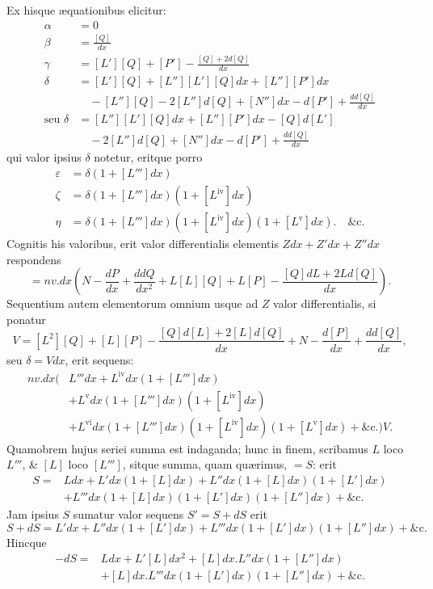 Ex hisque æquationibus elicitur:
\[
\begin{aligned}
\alpha&=0\\
\beta&=\frac{[Q]}{dx}\\
\gamma&=[L'][Q]+[P']-\frac{[Q]+2d[Q]}{dx}\\
\delta&=[L'][Q]+[L''][L'][Q]dx+[L''][P']dx\\
&\quad-[L''][Q]-2[L'']d[Q]+[N'']dx-d[P']+\frac{dd[Q]}{dx}\\
\text{seu }\delta&=[L''][L'][Q]dx+[L''][P']dx-[Q]d[L']\\
&\quad-2[L'']d[Q]+[N'']dx-d[P']+\frac{dd[Q]}{dx}
\end{aligned}
\]
qui valor ipsius $\delta$ notetur, eritque porro
\[
\begin{aligned}
\varepsilon&=\delta(1+[L''']dx)\\
\zeta&=\delta(1+[L''']dx)(1+[L^{\mathrm{iv}}]dx)\\
\eta&=\delta(1+[L''']dx)(1+[L^{\mathrm{iv}}]dx)(1+[L^{\mathrm{v}}]dx).\quad\text{\&c.}
\end{aligned}
\]
Cognitis his valoribus, erit valor differentialis elementis $Zdx+Z'dx+Z''dx$ respondens
\[
=nv.dx\left(N-\frac{dP}{dx}+\frac{ddQ}{dx^2}+L[L][Q]+L[P]-\frac{[Q]dL+2Ld[Q]}{dx}\right).
\]
Sequentium autem elementorum omnium usque ad $Z$ valor differentialis, si ponatur
\[
V=[L^2][Q]+[L][P]-\frac{[Q]d[L]+2[L]d[Q]}{dx}+N-\frac{d[P]}{dx}+\frac{dd[Q]}{dx},
\]
seu $\delta=Vdx$, erit sequens:
\[
\begin{aligned}
nv.dx\bigl(&L'''dx+L^{\mathrm{iv}}dx(1+[L''']dx)\\
&+L^{\mathrm{v}}dx(1+[L''']dx)(1+[L^{\mathrm{iv}}]dx)\\
&+L^{\mathrm{vi}}dx(1+[L''']dx)(1+[L^{\mathrm{iv}}]dx)(1+[L^{\mathrm{v}}]dx)+\text{\&c.}\bigr)V.
\end{aligned}
\]
Quamobrem hujus seriei summa est indaganda; hunc in finem, scribamus $L$ loco $L'''$, \& $[L]$ loco $[L''']$, sitque summa, quam quærimus, $=S$: erit
\[
\begin{aligned}
S={}&Ldx+L'dx(1+[L]dx)+L''dx(1+[L]dx)(1+[L']dx)\\
&+L'''dx(1+[L]dx)(1+[L']dx)(1+[L'']dx)+\text{\&c.}
\end{aligned}
\]
Jam ipsius $S$ sumatur valor sequens $S'=S+dS$ erit
\[
S+dS=L'dx+L''dx(1+[L']dx)+L'''dx(1+[L']dx)(1+[L'']dx)+\text{\&c.}
\]
Hincque
\[
\begin{aligned}
-dS={}&Ldx+L'[L]dx^2+[L]dx.L''dx(1+[L'']dx)\\
&+[L]dx.L'''dx(1+[L']dx)(1+[L'']dx)+\text{\&c.}
\end{aligned}
\]
